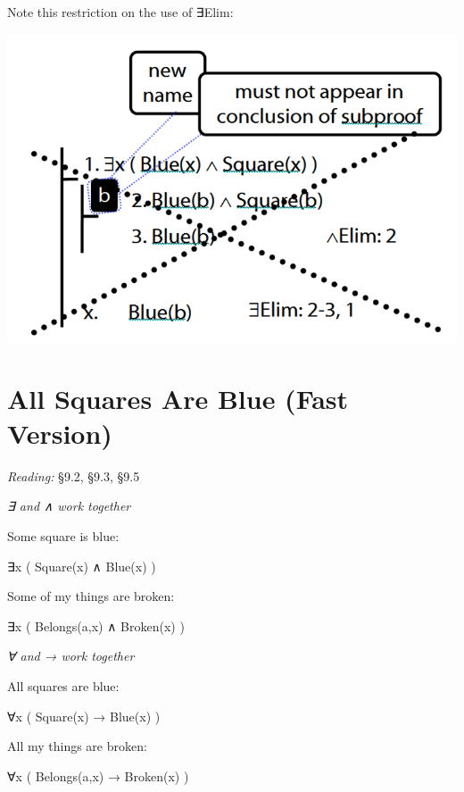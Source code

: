 \documentclass[12pt]{extarticle}
\begin{document}
\begin{multicols*}{3}
\begin{minipage}{\columnwidth}
Note this restriction on the use of ∃Elim:
 
\begin{center}
\includegraphics[scale=0.3]{img/proof_existential_elim_incorrect.png}
\end{center}
\end{minipage}
 
 
 
\section{All Squares Are Blue (Fast Version)}
 
\emph{Reading:} §9.2, §9.3, §9.5
 
\begin{minipage}{\columnwidth}
 
\emph{∃ and ∧ work together}
 
Some square is blue:
 
∃x ( Square(x) ∧ Blue(x) )
 
Some of my things are broken:
 
∃x ( Belongs(a,x) ∧ Broken(x) )
 
\end{minipage}
 
\begin{minipage}{\columnwidth}
 
\emph{∀ and → work together}
 
All squares are blue:
 
∀x ( Square(x) → Blue(x) )
 
All my things are broken:
 
∀x ( Belongs(a,x) → Broken(x) )
 

\end{minipage}
\end{multicols*}
\end{document}
